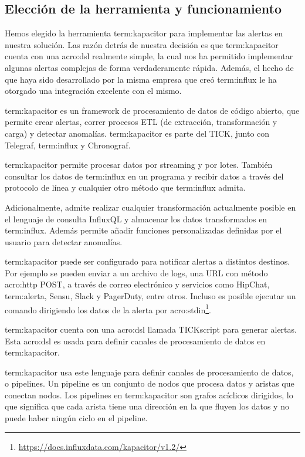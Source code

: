 \subsection{Elección de la herramienta y funcionamiento}
\label{eleccion-herramienta}

Hemos elegido la herramienta \gls{term:kapacitor} para implementar las alertas
en nuestra solución. Las razón detrás de nuestra decisión es que
\gls{term:kapacitor} cuenta con una \gls{acro:dsl} realmente simple, la cual
nos ha permitido implementar algunas alertas complejas de forma verdaderamente
rápida. Además, el hecho de que haya sido desarrollado por la misma empresa
que creó \gls{term:influx} le ha otorgado una integración excelente con el
mismo.

\gls{term:kapacitor} es un framework de procesamiento de datos de código
abierto, que permite crear alertas, correr procesos ETL (de extracción,
transformación y carga) y detectar anomalías. \gls{term:kapacitor} es parte del
 TICK, junto con Telegraf, \gls{term:influx} y Chronograf.

\gls{term:kapacitor} permite procesar datos por streaming y por lotes. También
consultar los datos de \gls{term:influx} en un programa y recibir datos a
través del protocolo de línea y cualquier otro método que \gls{term:influx}
admita.

Adicionalmente, admite realizar cualquier transformación actualmente posible en
el lenguaje de consulta InfluxQL y almacenar los datos transformados en
\gls{term:influx}. Además permite añadir funciones personalizadas definidas por
el usuario para detectar anomalías.

\gls{term:kapacitor} puede ser configurado para notificar alertas a distintos
destinos.  Por ejemplo se pueden enviar a un archivo de logs, una URL con
método \gls{acro:http} POST, a través de correo electrónico y servicios como
HipChat, \gls{term:alerta}, Sensu, Slack y PagerDuty, entre otros. Incluso es
posible ejecutar un comando dirigiendo los datos de la alerta por
\gls{acro:stdin}\footnote{\url{https://docs.influxdata.com/kapacitor/v1.2/}}.

\gls{term:kapacitor} cuenta con una \gls{acro:dsl} llamada TICKscript para
generar alertas. Esta \gls{acro:dsl} es usada para definir canales de
procesamiento de datos en \gls{term:kapacitor}.

\gls{term:kapacitor} usa este lenguaje para definir canales de procesamiento de
datos, o pipelines. Un pipeline es un conjunto de nodos que procesa datos y
aristas que conectan nodos. Los pipelines en \gls{term:kapacitor} son grafos
acíclicos dirigidos, lo que significa que cada arista tiene una dirección en la
que fluyen los datos y no puede haber ningún ciclo en el pipeline.

